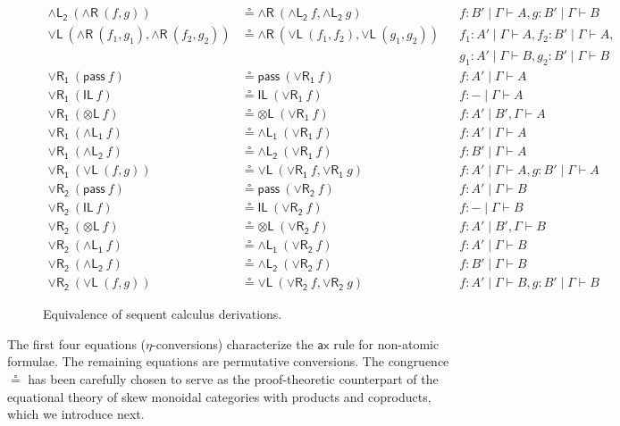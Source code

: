\documentclass[submission,copyright,creativecommons]{eptcs}
\theoremstyle{definition}
\newcommand{\tl}{\otimes \mathsf{L}}
\newcommand{\pass}{\mathsf{pass}}
\newcommand{\unitl}{\mathsf{IL}}
\newcommand{\andlone}{\land \mathsf{L_{1}}}
\newcommand{\andltwo}{\land \mathsf{L_{2}}}
\newcommand{\andr}{\land \mathsf{R}}
\newcommand{\orl}{\lor \mathsf{L}}
\newcommand{\orrone}{\lor \mathsf{R_{1}}}
\newcommand{\orrtwo}{\lor \mathsf{R_{2}}}
\newcommand{\ax}{\mathsf{ax}}
\newcommand{\ot}{\otimes}
\newcommand{\lolli}{\multimap}
\newcommand{\I}{\mathsf{I}}
\begin{document}
\begin{figure}[t]
\begin{equation}
\begin{array}{rlll}
    \\
    \andltwo \ (\andr \ (f , g)) &\circeq \andr \ (\andltwo \ f , \andltwo \ g)&&f : B' \mid \Gamma \vdash A , g : B' \mid \Gamma \vdash B
    \\
    \orl \ (\andr \ (f_1 , g_1) , \andr \ (f_2 , g_2)) &\circeq  \andr \ (\orl \ (f_1 , f_2) , \orl \ (g_1 , g_2)) &&f_1 : A' \mid \Gamma \vdash A , f_2 : B' \mid \Gamma \vdash A , 
    \\
    & &&g_1 : A' \mid \Gamma \vdash B , g_2 : B' \mid \Gamma \vdash B
    \\
    \orrone \ (\pass \ f) &\circeq \pass \ (\orrone \ f) &&f : A' \mid \Gamma \vdash A
    \\
    \orrone \ (\unitl \ f) &\circeq \unitl \ (\orrone \ f) &&f : - \mid \Gamma \vdash A
    \\
    \orrone \ (\tl \ f) &\circeq \tl \ (\orrone \ f) &&f : A' \mid B' , \Gamma \vdash A
    \\
    \orrone \ (\andlone \ f) &\circeq \andlone \ (\orrone \ f) &&f : A' \mid \Gamma \vdash A
    \\
    \orrone \ (\andltwo \ f) &\circeq \andltwo \ (\orrone \ f) &&f : B' \mid \Gamma \vdash A
    \\
    \orrone \ (\orl \ (f , g)) &\circeq \orl \ (\orrone \ f , \orrone \ g) &&f : A' \mid \Gamma \vdash A , g : B' \mid \Gamma \vdash A
    \\
    \orrtwo \ (\pass \ f) &\circeq \pass \ (\orrtwo \ f) &&f : A' \mid \Gamma \vdash B
    \\
    \orrtwo \ (\unitl \ f) &\circeq \unitl \ (\orrtwo \ f) &&f : - \mid \Gamma \vdash B
    \\
    \orrtwo \ (\tl \ f) &\circeq \tl \ (\orrtwo \ f) &&f : A' \mid B' , \Gamma \vdash B
    \\
    \orrtwo \ (\andlone \ f) &\circeq \andlone \ (\orrtwo \ f) &&f : A' \mid \Gamma \vdash B
    \\
    \orrtwo \ (\andltwo \ f) &\circeq \andltwo \ (\orrtwo \ f) &&f : B' \mid \Gamma \vdash B
    \\
    \orrtwo \ (\orl \ (f , g)) &\circeq \orl \ (\orrtwo \ f , \orrtwo \ g) &&f : A' \mid \Gamma \vdash B , g : B' \mid \Gamma \vdash B
  \end{array}
  \end{equation}
  \caption{Equivalence of sequent calculus derivations.}
\end{figure}
The first four equations ($\eta$-conversions) characterize the $\ax$ rule for non-atomic formulae. The remaining equations are permutative conversions. The congruence $\circeq$ has been carefully chosen to serve as the proof-theoretic counterpart of the equational theory of skew monoidal categories with products and coproducts, which we introduce next.
\end{document}
